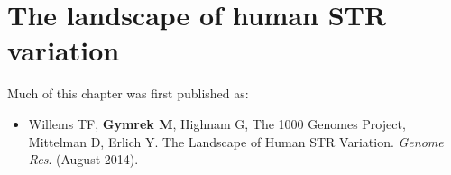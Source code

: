 \iffalse  \fi

\chapter{The landscape of human STR variation}

\hzline

Much of this chapter was first published as:

\begin{itemize}
\item[] Willems TF, \textbf{Gymrek M}, Highnam G, The 1000 Genomes Project, Mittelman D, Erlich Y. The
  Landscape of Human STR Variation. \emph{Genome Res}. (August 2014).
\end{itemize}

\hzline

